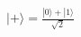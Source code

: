\documentclass[preview]{standalone}
\begin{document}
\begin{center}
$|+\rangle = \frac{|0\rangle + |1\rangle}{\sqrt{2}}$
\end{center}
\end{document}
